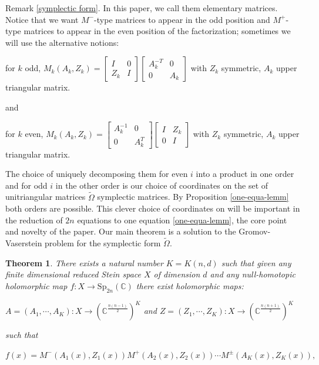 \documentclass[10pt]{amsart}
\newtheorem{theo}{Theorem}[section]
\theoremstyle{remark}
\begin{document}
Remark \ref{symplectic form}. In this paper, we call them elementary matrices. Notice that we want $M^-$-type matrices to appear in the odd position and $M^+$-type matrices to appear in the even position of the factorization; sometimes we will use the alternative notions: 
\begin{center}
      for $k$ odd, $M_k(A_k,Z_k) = \left[\begin{array}{ccc} I & 0 \\ Z_k & I\end{array}\right]\left[\begin{array}{ccc} A^{-T}_k & 0 \\ 0 & A_k\end{array}\right]$  with $Z_k$ symmetric, $A_k$ upper triangular matrix.
    \end{center}
    and
    \begin{center}
    for $k$ even, $M_k(A_k,Z_k) =\left[\begin{array}{ccc} A^{-1}_k & 0 \\ 0 & A^T_k\end{array}\right]\left[\begin{array}{ccc} I & Z_k \\ 0 & I\end{array}\right]  $ with $Z_k$ symmetric, $A_k$ upper triangular matrix. 
    \end{center}
The choice of uniquely decomposing them for even $i$ into a product in one order and for odd $i$ in the other order is our choice
of coordinates on the set of unitriangular matrices
$\tilde \Omega $ symplectic matrices. By Proposition \ref{one-equa-lemm} both orders are possible. This clever choice
of coordinates on will be important in the reduction of
$2n$ equations to one equation \ref{one-equa-lemm}, the core point and novelty of the paper.
\fi
Our main theorem is a solution to the Gromov-Vaserstein problem for the symplectic form $\tilde \Omega$.

\begin{theo}\label{main-theo} 
There exists a natural
number $K = K(n, d)$ such that given any finite dimensional reduced Stein space $X$ of dimension
$d$ and any null-homotopic holomorphic map $f : X \to \mathrm{Sp}_{2n}(\mathbb{C})$ there exist holomorphic maps:
\begin{center}
$A = (A_1, \cdots, A_K) : X \to (\mathbb{C}^{\frac{n(n-1)}{2}} )^K
$  and $Z = (Z_1, \cdots, Z_K) : X \to (\mathbb{C}^{\frac{n(n+1)}{2}} )^K
$ 
\end{center}
such that
\begin{center}
 $f(x) = M^-(A_1(x), Z_1(x)) M^+(A_2(x), Z_2(x)) 
 \cdots M^{\pm}(A_K(x), Z_K(x)),$     
\end{center}
\end{theo}
\end{document}

